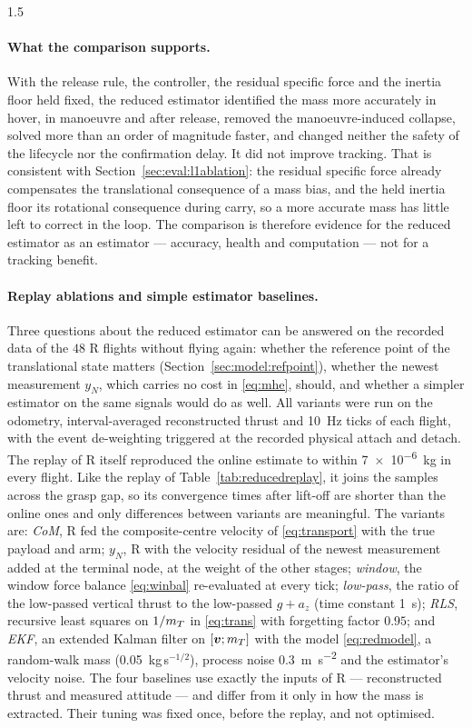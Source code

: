 \begin{spacing}{1.5}
\paragraph{What the comparison supports.} With the release rule, the controller,
the residual specific force and the inertia floor held fixed, the reduced
estimator identified the mass more accurately in hover, in manoeuvre and after
release, removed the manoeuvre-induced collapse, solved more than an order of
magnitude faster, and changed neither the safety of the lifecycle nor the
confirmation delay. It did not improve tracking. That is consistent with
Section~\ref{sec:eval:l1ablation}: the residual specific force already
compensates the translational consequence of a mass bias, and the held inertia
floor its rotational consequence during carry, so a more accurate mass has
little left to correct in the loop. The comparison is therefore evidence for the
reduced estimator as an estimator --- accuracy, health and computation --- not
for a tracking benefit.

\paragraph{Replay ablations and simple estimator baselines.} Three questions
about the reduced estimator can be answered on the recorded data of the $48$ R
flights without flying again: whether the reference point of the translational
state matters (Section~\ref{sec:model:refpoint}), whether the newest measurement
$y_N$, which carries no cost in \eqref{eq:mhe}, should, and whether a simpler
estimator on the same signals would do as well. All variants were run on the
odometry, interval-averaged reconstructed thrust and \SI{10}{\hertz} ticks of
each flight, with the event de-weighting triggered at the recorded physical
attach and detach. The replay of R itself reproduced the online estimate to
within \SI{7e-6}{\kg} in every flight. Like the replay of
Table~\ref{tab:reducedreplay}, it joins the samples across the grasp gap, so its
convergence times after lift-off are shorter than the online ones and only
differences between variants are meaningful. The variants are:
\emph{CoM}, R fed the composite-centre velocity of \eqref{eq:transport} with the
true payload and arm; \emph{$y_N$}, R with the velocity residual of the newest
measurement added at the terminal node, at the weight of the other stages;
\emph{window}, the window force balance \eqref{eq:winbal} re-evaluated at every
tick; \emph{low-pass}, the ratio of the low-passed vertical thrust to the
low-passed $g+a_z$ (time constant \SI{1}{\second}); \emph{RLS}, recursive least
squares on $1/m_T$ in \eqref{eq:trans} with forgetting factor $0.95$; and
\emph{EKF}, an extended Kalman filter on $[\bm v;m_T]$ with the model
\eqref{eq:redmodel}, a random-walk mass (\SI{0.05}{\kg}\,s$^{-1/2}$),
process noise \SI{0.3}{\meter\per\second\squared} and the estimator's velocity
noise. The four baselines use exactly the inputs of R --- reconstructed thrust and
measured attitude --- and differ from it only in how the mass is extracted. Their
tuning was fixed once, before the replay, and not optimised.


\end{spacing}
